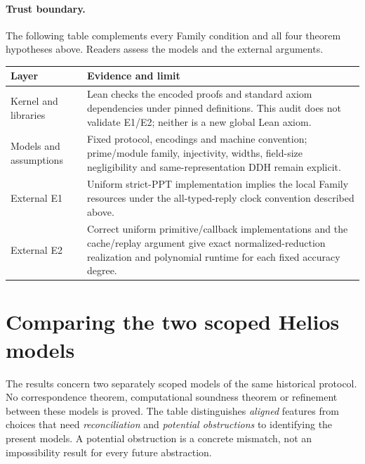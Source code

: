 \documentclass[11pt]{article}
\begin{document}
\paragraph{Trust boundary.}
The following table complements every Family condition and all four theorem
hypotheses above. Readers assess the models and the external arguments.
\begin{center}\small
\begin{tabular}{@{}>{\raggedright\arraybackslash}p{.22\linewidth}>{\raggedright\arraybackslash}p{.70\linewidth}@{}}
\toprule
Layer & Evidence and limit\\\midrule
Kernel and libraries & Lean checks the encoded proofs and standard axiom dependencies under pinned definitions. This audit does not validate E1/E2; neither is a new global Lean axiom.\\\addlinespace
Models and assumptions & Fixed protocol, encodings and machine convention; prime/module family, injectivity, widths, field-size negligibility and same-representation DDH remain explicit.\\\addlinespace
External E1 & Uniform strict-PPT implementation implies the local Family resources under the all-typed-reply clock convention described above.\\\addlinespace
External E2 & Correct uniform primitive/callback implementations and the cache/replay argument give exact normalized-reduction realization and polynomial runtime for each fixed accuracy degree.\\\bottomrule
\end{tabular}\end{center}

\section{Comparing the two scoped Helios models}\label{sec:scope-comparison}
The results concern two separately scoped models of the same historical protocol.
No correspondence theorem, computational soundness theorem or refinement between
these models is proved. The table distinguishes \emph{aligned} features from
choices that need \emph{reconciliation} and \emph{potential obstructions} to
identifying the present models. A potential obstruction is a concrete mismatch,
not an impossibility result for every future abstraction.
\end{document}
